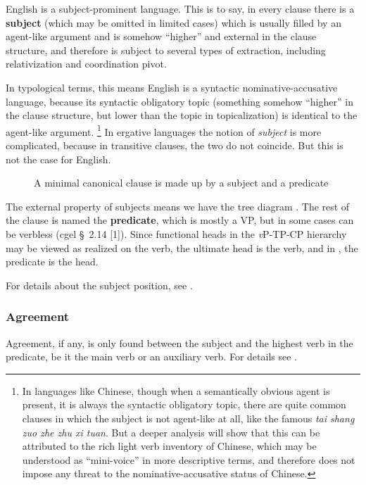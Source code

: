 \documentclass{article}
\newcommand*{\citesec}[1]{\S~{#1}}
\newcommand*{\concept}[1]{\textbf{#1}}
\newcommand*{\term}[1]{\emph{#1}}
\newcommand*{\corpus}[1]{\emph{#1}}
\newcommand*{\vP}{\textit{v}P}
\begin{document}
English is a subject-prominent language.
This is to say, in every clause there is a \concept{subject} 
(which may be omitted in limited cases) %
which is usually filled by an agent-like argument
and is somehow ``higher'' and external in the clause structure,
and therefore is subject to several types of extraction, 
including relativization and coordination pivot.

In typological terms, this means English is a syntactic nominative-accusative language,
because its syntactic obligatory topic 
(something somehow ``higher'' in the clause structure,
but lower than the topic in topicalization)
is identical to the agent-like argument.%
\footnote{In languages like Chinese, though when a semantically obvious agent is present,
it is always the syntactic obligatory topic, 
there are quite common clauses in which the subject is not agent-like at all,
like the famous \corpus{tai shang zuo zhe zhu xi tuan}.
But a deeper analysis will show that this can be attributed to 
the rich light verb inventory of Chinese,
which may be understood as ``mini-voice'' in more descriptive terms,
and therefore does not impose any threat to the nominative-accusative status of Chinese.}
In ergative languages the notion of \term{subject} is more complicated,
because in transitive clauses, the two do not coincide.
But this is not the case for English.

\begin{figure}
    \centering
    
    \caption{A minimal canonical clause is made up by a subject and a predicate}
    \label{fig:subject-predicate}
\end{figure}

The external property of subjects means we have the tree diagram .
The rest of the clause is named the \concept{predicate},
which is mostly a VP, but in some cases can be verbless (\ac{cgel} \citesec{2.14} [1]).
Since functional heads in the \vP-TP-CP hierarchy may be viewed as realized on the verb,
the ultimate head is the verb,
and in , the predicate is the head.

For details about the subject position, see .

\subsubsection{Agreement}\label{sec:agreement}

Agreement, if any, is only found between the subject and the highest verb in the predicate,
be it the main verb or an auxiliary verb. 
For details see .
\end{document}
